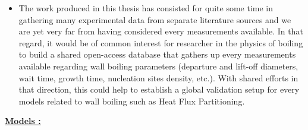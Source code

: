 \begin{itemize}
\item The work produced in this thesis has consisted for quite some time in gathering many experimental data from separate literature sources and we are yet very far from having considered every measurements available. In that regard, it would be of common interest for researcher in the physics of boiling to build a shared open-access database that gathers up every measurements available regarding wall boiling parameters (departure and lift-off diameters, wait time, growth time, nucleation sites density, etc.). With shared efforts in that direction, this could help to establish a global validation setup for every models related to wall boiling such as Heat Flux Partitioning.
\end{itemize}

\textbf{\underline{Models :}}

